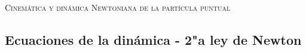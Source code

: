 \documentclass[11pt, spanish, a4paper, twoside]{article}
\begin{document}
\begin{center}
  \textsc{\large Cinemática y dinámica Newtoniana de la partícula puntual}
\end{center}

\begin{enumerate}


\section*{Ecuaciones de la dinámica - 2"a ley de Newton}



\end{enumerate}
\end{document}
